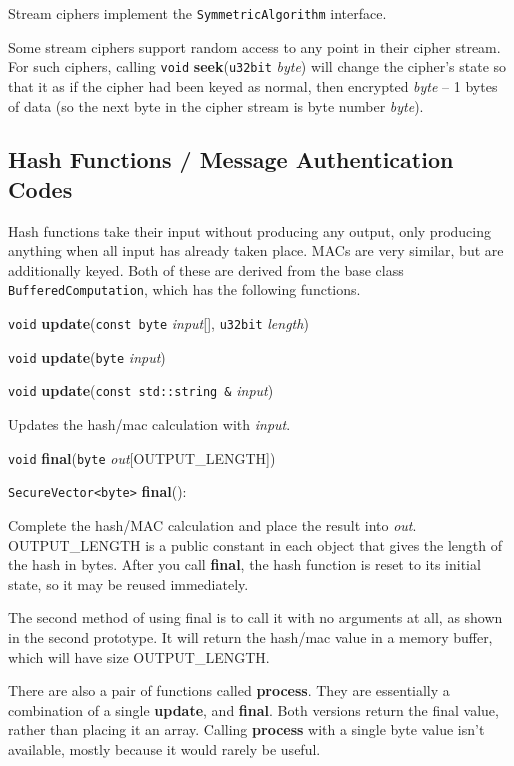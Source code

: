 \documentclass{article}
\newcommand{\function}[1]{\textbf{#1}}
\newcommand{\type}[1]{\texttt{#1}}
\renewcommand{\arg}[1]{\textsl{#1}}
\begin{document}
Stream ciphers implement the \type{SymmetricAlgorithm} interface.

Some stream ciphers support random access to any point in their cipher
stream. For such ciphers, calling \type{void} \function{seek}(\type{u32bit}
\arg{byte}) will change the cipher's state so that it as if the cipher had been
keyed as normal, then encrypted \arg{byte} -- 1 bytes of data (so the next byte
in the cipher stream is byte number \arg{byte}).

\subsection{Hash Functions / Message Authentication Codes}

Hash functions take their input without producing any output, only producing
anything when all input has already taken place. MACs are very similar, but are
additionally keyed. Both of these are derived from the base class
\type{BufferedComputation}, which has the following functions.

\noindent
\type{void} \function{update}(\type{const byte} \arg{input}[], \type{u32bit}
\arg{length})

\noindent
\type{void} \function{update}(\type{byte} \arg{input})

\noindent
\type{void} \function{update}(\type{const std::string \&} \arg{input})

Updates the hash/mac calculation with \arg{input}.

\noindent
\type{void} \function{final}(\type{byte} \arg{out}[OUTPUT\_LENGTH])

\noindent
\type{SecureVector<byte>} \function{final}():

Complete the hash/MAC calculation and place the result into \arg{out}.
OUTPUT\_LENGTH is a public constant in each object that gives the length of the
hash in bytes. After you call \function{final}, the hash function is reset to
its initial state, so it may be reused immediately.

The second method of using final is to call it with no arguments at all, as
shown in the second prototype. It will return the hash/mac value in a memory
buffer, which will have size OUTPUT\_LENGTH.

There are also a pair of functions called \function{process}. They are
essentially a combination of a single \function{update}, and \function{final}.
Both versions return the final value, rather than placing it an array. Calling
\function{process} with a single byte value isn't available, mostly because it
would rarely be useful.
\end{document}
